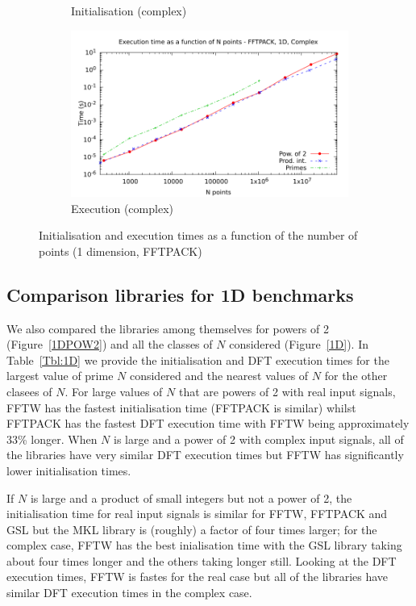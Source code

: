 \documentclass[12pt, a4paper]{article} \setlength{\textheight}{24cm}
\begin{document}
\begin{figure}[H]
\begin{subfigure}{.5\textwidth}
    \caption{Initialisation (complex)}
    \label{1DFFTPACKCI}
  \end{subfigure}%
  \begin{subfigure}{.5\textwidth}
    \centering
    \includegraphics[width=.9\linewidth]{graphs/1d-fftpack-exec-c.pdf}
    \caption{Execution (complex)}
    \label{1DFFTPACKC}
  \end{subfigure}
  \caption{Initialisation and execution times as a function of the
    number of points (1 dimension, FFTPACK)}
  \label{1DFFTPACK}
\end{figure}


\subsection{Comparison libraries for 1D benchmarks}
We also compared the libraries among themselves for powers of 2
(Figure~\ref{1DPOW2}) and all the classes of $N$ considered
(Figure~\ref{1D}). In Table~\ref{Tbl:1D} we provide the initialisation
and DFT execution times for the largest value of prime $N$ considered
and the nearest values of $N$ for the other clasees of $N.$ For large
values of $N$ that are powers of 2 with real input signals, FFTW has
the fastest initialisation time (FFTPACK is similar) whilst FFTPACK
has the fastest DFT execution time with FFTW being approximately 33\%
longer. When $N$ is large and a power of 2 with complex input signals,
all of the libraries have very similar DFT execution times but FFTW
has significantly lower initialisation times.

If $N$ is large and a product of small integers but not a power of 2,
the initialisation time for real input signals is similar for FFTW,
FFTPACK and GSL but the MKL library is (roughly) a factor of four
times larger; for the complex case, FFTW has the best inialisation
time with the GSL library taking about four times longer and the
others taking longer still. Looking at the DFT execution times, FFTW
is fastes for the real case but all of the libraries have similar DFT
execution times in the complex case.
\end{document}
